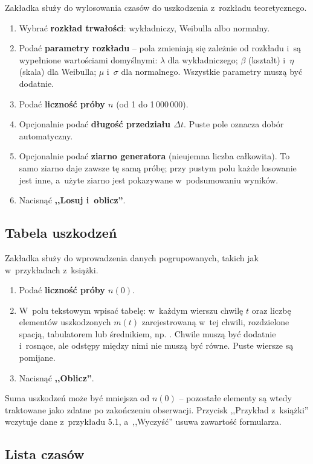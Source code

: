 Zakładka służy do wylosowania czasów do uszkodzenia z~rozkładu teoretycznego.
\begin{enumerate}
  \item Wybrać \textbf{rozkład trwałości}: wykładniczy, Weibulla albo normalny.
  \item Podać \textbf{parametry rozkładu} -- pola zmieniają się zależnie od rozkładu
    i~są wypełnione wartościami domyślnymi: $\lambda$ dla wykładniczego; $\beta$
    (kształt) i~$\eta$ (skala) dla Weibulla; $\mu$ i~$\sigma$ dla normalnego.
    Wszystkie parametry muszą być dodatnie.
  \item Podać \textbf{liczność próby $n$} (od 1 do 1\,000\,000).
  \item Opcjonalnie podać \textbf{długość przedziału $\Delta t$}. Puste pole oznacza
    dobór automatyczny.
  \item Opcjonalnie podać \textbf{ziarno generatora} (nieujemna liczba całkowita).
    To samo ziarno daje zawsze tę samą próbę; przy pustym polu każde losowanie jest
    inne, a~użyte ziarno jest pokazywane w~podsumowaniu wyników.
  \item Nacisnąć \textbf{,,Losuj i~oblicz''}.
\end{enumerate}

\subsection{Tabela uszkodzeń}

Zakładka służy do wprowadzenia danych pogrupowanych, takich jak w~przykładach
z~książki.
\begin{enumerate}
  \item Podać \textbf{liczność próby $n(0)$}.
  \item W~polu tekstowym wpisać tabelę: w~każdym wierszu chwilę $t$ oraz liczbę
    elementów uszkodzonych $m(t)$ zarejestrowaną w~tej chwili, rozdzielone spacją,
    tabulatorem lub średnikiem, np. . Chwile muszą być dodatnie i~rosnące,
    ale odstępy między nimi nie muszą być równe. Puste wiersze są pomijane.
  \item Nacisnąć \textbf{,,Oblicz''}.
\end{enumerate}
Suma uszkodzeń może być mniejsza od $n(0)$ -- pozostałe elementy są wtedy traktowane
jako zdatne po zakończeniu obserwacji. Przycisk ,,Przykład z~książki'' wczytuje dane
z~przykładu 5.1, a~,,Wyczyść'' usuwa zawartość formularza.

\subsection{Lista czasów}

